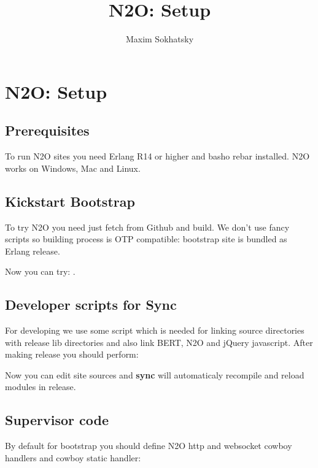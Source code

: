\documentclass[11pt]{article}
\begin{document}
\title{N2O: Setup}
\author{Maxim Sokhatsky}

\paragraph{}
\section*{N2O: Setup}

\subsection*{Prerequisites}
To run N2O sites you need Erlang R14 or higher and basho rebar installed.
N2O works on Windows, Mac and Linux.

\subsection*{Kickstart Bootstrap}
To try N2O you need just fetch from Github and build. We don't use
fancy scripts so building process is OTP compatible: bootstrap site
is bundled as Erlang release.


Now you can try: .

\subsection*{Developer scripts for Sync}
For developing we use some script which is needed for linking source
directories with release lib directories and also link BERT, N2O and jQuery javascript.
After making release you should perform:


Now you can edit site sources and {\bf sync} will automaticaly recompile
and reload modules in release.

\subsection*{Supervisor code}
By default for bootstrap you should define N2O http and websocket cowboy handlers
and cowboy static handler:








\end{document}
